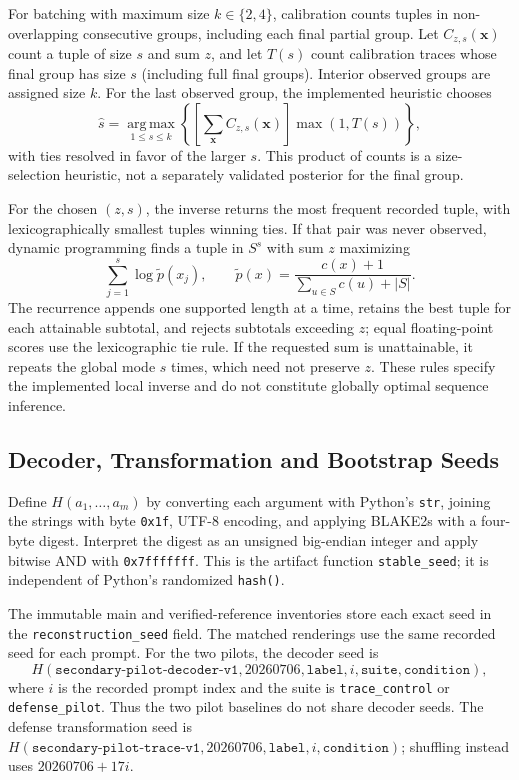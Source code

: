 \documentclass[electronics,article,submit,pdftex,moreauthors]{Definitions/mdpi}
\begin{document}
For batching with maximum size $k\in\{2,4\}$, calibration counts tuples in non-overlapping consecutive groups, including each final partial group. Let $C_{z,s}(\mathbf{x})$ count a tuple of size $s$ and sum $z$, and let $T(s)$ count calibration traces whose final group has size $s$ (including full final groups). Interior observed groups are assigned size $k$. For the last observed group, the implemented heuristic chooses
\[
 \widehat{s}=\operatorname*{arg\,max}_{1\leq s\leq k}
 \left\{\left[\sum_{\mathbf{x}} C_{z,s}(\mathbf{x})\right]\max(1,T(s))\right\},
\]
with ties resolved in favor of the larger $s$. This product of counts is a size-selection heuristic, not a separately validated posterior for the final group.

For the chosen $(z,s)$, the inverse returns the most frequent recorded tuple, with lexicographically smallest tuples winning ties. If that pair was never observed, dynamic programming finds a tuple in $S^s$ with sum $z$ maximizing
\[
 \sum_{j=1}^{s}\log\widetilde p(x_j),
 \qquad
 \widetilde p(x)=\frac{c(x)+1}{\sum_{u\in S}c(u)+|S|}.
\]
The recurrence appends one supported length at a time, retains the best tuple for each attainable subtotal, and rejects subtotals exceeding $z$; equal floating-point scores use the lexicographic tie rule. If the requested sum is unattainable, it repeats the global mode $s$ times, which need not preserve $z$. These rules specify the implemented local inverse and do not constitute globally optimal sequence inference.

\subsection{Decoder, Transformation and Bootstrap Seeds}
Define $H(a_1,\ldots,a_m)$ by converting each argument with Python's \texttt{str}, joining the strings with byte \texttt{0x1f}, UTF-8 encoding, and applying BLAKE2s with a four-byte digest. Interpret the digest as an unsigned big-endian integer and apply bitwise AND with \texttt{0x7fffffff}. This is the artifact function \texttt{stable\_seed}; it is independent of Python's randomized \texttt{hash()}.

The immutable main and verified-reference inventories store each exact seed in the \texttt{reconstruction\_seed} field. The matched renderings use the same recorded seed for each prompt. For the two pilots, the decoder seed is
\[
H(\texttt{secondary-pilot-decoder-v1},20260706,\texttt{label},i,
  \texttt{suite},\texttt{condition}),
\]
where $i$ is the recorded prompt index and the suite is \texttt{trace\_control} or \texttt{defense\_pilot}. Thus the two pilot baselines do not share decoder seeds. The defense transformation seed is $H(\texttt{secondary-pilot-trace-v1},20260706,\texttt{label},i,\texttt{condition})$; shuffling instead uses $20260706+17i$.
\end{document}
